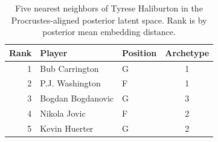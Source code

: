 \begin{table}[htbp]
  \centering\small
  \begin{tabular}{rllc}
    \toprule
    Rank & Player & Position & Archetype \\
    \midrule
    1 & Bub Carrington & G & 1 \\
    2 & P.J. Washington & F & 1 \\
    3 & Bogdan Bogdanovic & G & 3 \\
    4 & Nikola Jovic & F & 2 \\
    5 & Kevin Huerter & G & 2 \\
    \bottomrule
  \end{tabular}
  \caption{Five nearest neighbors of Tyrese Haliburton in the Procrustes-aligned posterior latent space. Rank is by posterior mean embedding distance.}
  \label{tab:Tyrese_Haliburton_neighbors}
\end{table}

